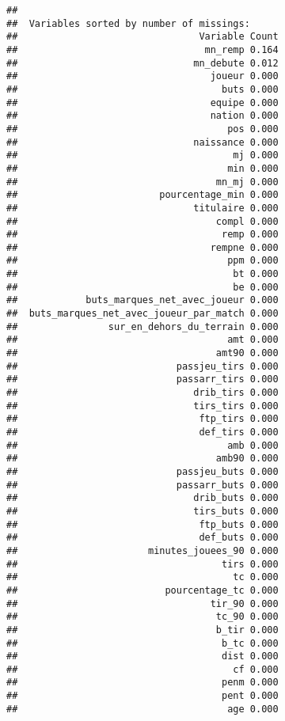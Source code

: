 \documentclass[7pt,]{report}
\begin{document}
\begin{verbatim}
## 
##  Variables sorted by number of missings: 
##                                Variable Count
##                                 mn_remp 0.164
##                               mn_debute 0.012
##                                  joueur 0.000
##                                    buts 0.000
##                                  equipe 0.000
##                                  nation 0.000
##                                     pos 0.000
##                               naissance 0.000
##                                      mj 0.000
##                                     min 0.000
##                                   mn_mj 0.000
##                         pourcentage_min 0.000
##                               titulaire 0.000
##                                   compl 0.000
##                                    remp 0.000
##                                  rempne 0.000
##                                     ppm 0.000
##                                      bt 0.000
##                                      be 0.000
##            buts_marques_net_avec_joueur 0.000
##  buts_marques_net_avec_joueur_par_match 0.000
##                sur_en_dehors_du_terrain 0.000
##                                     amt 0.000
##                                   amt90 0.000
##                            passjeu_tirs 0.000
##                            passarr_tirs 0.000
##                               drib_tirs 0.000
##                               tirs_tirs 0.000
##                                ftp_tirs 0.000
##                                def_tirs 0.000
##                                     amb 0.000
##                                   amb90 0.000
##                            passjeu_buts 0.000
##                            passarr_buts 0.000
##                               drib_buts 0.000
##                               tirs_buts 0.000
##                                ftp_buts 0.000
##                                def_buts 0.000
##                       minutes_jouees_90 0.000
##                                    tirs 0.000
##                                      tc 0.000
##                          pourcentage_tc 0.000
##                                  tir_90 0.000
##                                   tc_90 0.000
##                                   b_tir 0.000
##                                    b_tc 0.000
##                                    dist 0.000
##                                      cf 0.000
##                                    penm 0.000
##                                    pent 0.000
##                                     age 0.000
\end{verbatim}
\end{document}
